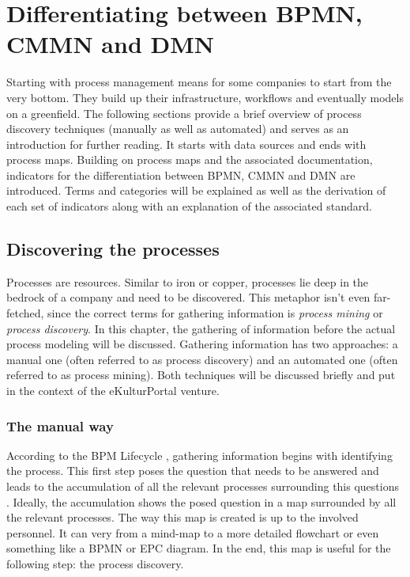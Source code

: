 

\chapter{Differentiating between BPMN, CMMN and DMN}
\label{chapter:indicators}

Starting with process management means for some companies to start from the very bottom. They build up their infrastructure, workflows and eventually models on a greenfield. The following sections provide a brief overview of process discovery techniques (manually as well as automated) and serves as an introduction for further reading. It starts with data sources and ends with process maps. Building on process maps and the associated documentation, indicators for the differentiation between BPMN, CMMN and DMN are introduced. Terms and categories will be explained as well as the derivation of each set of indicators along with an explanation of the associated standard. 


\section{Discovering the processes}
\label{section:process_discovery}
Processes are resources. Similar to iron or copper, processes lie deep in the bedrock of a company and need to be discovered. This metaphor isn't even far-fetched, since the correct terms for gathering information is \textit{process mining} or \textit{process discovery}.
In this chapter, the gathering of information before the actual process modeling will be discussed. Gathering information has two approaches: a manual one (often referred to as process discovery) and an automated one (often referred to as process mining). Both techniques will be discussed briefly and put in the context of the eKulturPortal venture. 

\subsection{The manual way}
According to the BPM Lifecycle \cite{Dumas2013}, gathering information begins with identifying the process. This first step poses the question that needs to be answered and leads to the accumulation of all the relevant processes surrounding this questions \cite{Dumas2013}. Ideally, the accumulation shows the posed question in a map surrounded by all the relevant processes. The way this map is created is up to the involved personnel. It can very from a mind-map to a more detailed flowchart or even something like a BPMN or EPC diagram. In the end, this map is useful for the following step: the process discovery. 

